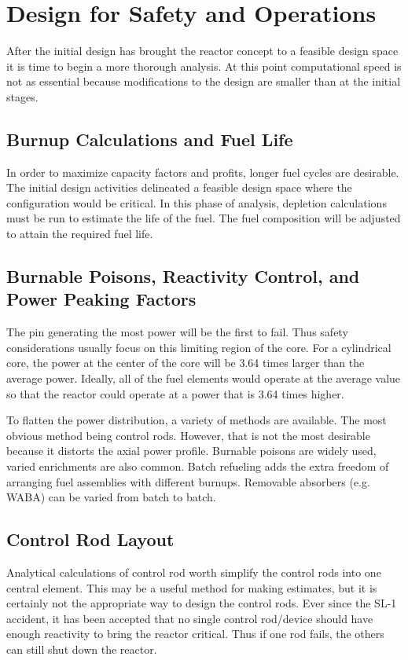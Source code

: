 \chapter{Design for Safety and Operations}

After the initial design has brought the reactor concept to a feasible design space it is time to begin a more thorough analysis.
At this point computational speed is not as essential because modifications to the design are smaller than at the initial stages.

\section{Burnup Calculations and Fuel Life}
In order to maximize capacity factors and profits, longer fuel cycles are desirable. 
The initial design activities delineated a feasible design space where the configuration would be critical. In this phase of analysis, depletion calculations must be run to estimate the life of the fuel. The fuel composition will be adjusted to attain the required fuel life.


\section{Burnable Poisons, Reactivity Control, and Power Peaking Factors}

The pin generating the most power will be the first to fail. Thus safety considerations usually focus on this limiting region of the core. For a cylindrical core, the power at the center of the core will be 3.64 times larger than the average power. 
Ideally, all of the fuel elements would operate at the average value so that the reactor could operate at a power that is 3.64 times higher.

To flatten the power distribution, a variety of methods are available. 
The most obvious method being control rods. However, that is not the most desirable because it distorts the axial power profile.
Burnable poisons are widely used, varied enrichments are also common. 
Batch refueling adds the extra freedom of arranging fuel assemblies with different burnups. 
Removable absorbers (e.g. WABA) can be varied from batch to batch.


\section{Control Rod Layout}
Analytical calculations of control rod worth simplify the control rods into one central element. This may be a useful method for making estimates, but it is certainly not the appropriate way to design the control rods.
Ever since the SL-1 accident, it has been accepted that no single control rod/device should have enough reactivity to bring the reactor critical. Thus if one rod fails, the others can still shut down the reactor.

